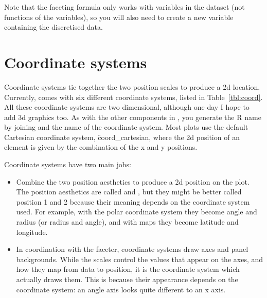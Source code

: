 Note that the faceting formula only works with variables in the dataset (not functions of the variables), so you will also need to create a new variable containing the discretised data.

\section{Coordinate systems}
\label{sec:coord}

Coordinate systems tie together the two position scales to produce a 2d location. Currently, \ggplot comes with six different coordinate systems, listed in Table~\ref{tbl:coord}.  All these coordinate systems are two dimensional, although one day I hope to add 3d graphics too. As with the other components in \ggplot, you generate the R name by joining  and the name of the coordinate system.  Most plots use the default Cartesian coordinate system, \f{coord_cartesian}, where the 2d position of an element is given by the combination of the x and y positions.  

Coordinate systems have two main jobs: 

\begin{itemize}
  \item Combine the two position aesthetics to produce a 2d position on the plot.  The position aesthetics are called  and , but they might be better called position 1 and 2 because their meaning depends on the coordinate system used.  For example, with the polar coordinate system they become angle and radius (or radius and angle), and with maps they become latitude and longitude.
  
  \item In coordination with the faceter, coordinate systems draw axes and panel backgrounds.  While the scales control the values that appear on the axes, and how they map from data to position, it is the coordinate system which actually draws them.  This is because their appearance depends on the coordinate system: an angle axis looks quite different to an x axis. 

\end{itemize}


